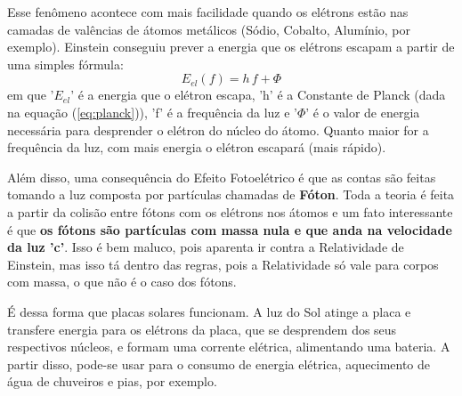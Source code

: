 \documentclass[12pt]{extarticle}
\newcommand{\<}{\langle}
\renewcommand{\>}{\rangle}
\theoremstyle{definition}
\begin{document}
Esse fenômeno acontece com mais facilidade quando os elétrons estão nas camadas de valências de átomos metálicos (Sódio, Cobalto, Alumínio, por exemplo). Einstein conseguiu prever a energia que os elétrons escapam a partir de uma simples fórmula:
\begin{equation}
    E_{el}(f) = h\,f + \Phi
\end{equation}
\noindent em que '$E_{el}$' é a energia que o elétron escapa, 'h' é a Constante de Planck (dada na equação (\ref{eq:planck})), 'f' é a frequência da luz e '$\Phi$' é o valor de energia necessária para desprender o elétron do núcleo do átomo. Quanto maior for a frequência da luz, com mais energia o elétron escapará (mais rápido). 

Além disso, uma consequência do Efeito Fotoelétrico é que as contas são feitas tomando a luz composta por partículas chamadas de \textbf{Fóton}. Toda a teoria é feita a partir da colisão entre fótons com os elétrons nos átomos e um fato interessante é que \textbf{os fótons são partículas com massa nula e que anda na velocidade da luz 'c'}. Isso é bem maluco, pois aparenta ir contra a Relatividade de Einstein, mas isso tá dentro das regras, pois a Relatividade só vale para corpos com massa, o que não é o caso dos fótons.

É dessa forma que placas solares funcionam. A luz do Sol atinge a placa e transfere energia para os elétrons da placa, que se desprendem dos seus respectivos núcleos, e formam uma corrente elétrica, alimentando uma bateria. A partir disso, pode-se usar para o consumo de energia elétrica, aquecimento de água de chuveiros e pias, por exemplo.
\end{document}
